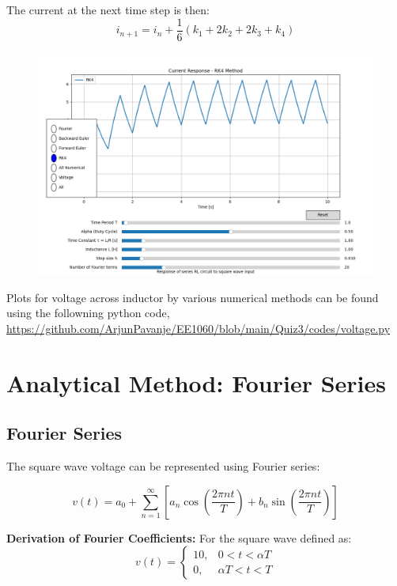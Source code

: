 \documentclass[12pt,a4paper]{report}
\begin{document}
The current at the next time step is then:
\begin{equation}
i_{n+1} = i_n + \frac{1}{6}(k_1 + 2k_2 + 2k_3 + k_4)
\end{equation}

\begin{figure}[h!]
	\centering
	\includegraphics[scale=0.5]{figs/RK4-numerical.png}
\end{figure}
Plots for voltage across inductor by various numerical methods can be found using the followning python code, \url{https://github.com/ArjunPavanje/EE1060/blob/main/Quiz3/codes/voltage.py}
\chapter{Analytical Method: Fourier Series}
\section{Fourier Series}
The square wave voltage can be represented using Fourier series:

\begin{equation}
v(t) = a_0 + \sum_{n=1}^{\infty}\left[a_n\cos\left(\frac{2\pi nt}{T}\right) + b_n\sin\left(\frac{2\pi nt}{T}\right)\right]
\end{equation}

\textbf{Derivation of Fourier Coefficients:}
For the square wave defined as:
\begin{equation}
v(t) = 
\begin{cases}
10, & 0 < t < \alpha T \\
0, & \alpha T < t < T
\end{cases}
\end{equation}
\end{document}
